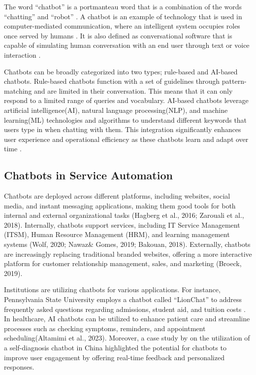The word “chatbot” is a portmanteau word that is a combination of the words “chatting” and “robot” \cite{rese2020}. A chatbot is an example of technology that is used in computer-mediated communication, where an intelligent system occupies roles once served by humans \cite{beattie2020}. It is also defined as conversational software that is capable of simulating human conversation with an end user through text or voice interaction \cite{Naruzzaman}.

Chatbots can be broadly categorized into two types; rule-based and AI-based chatbots. Rule-based chatbots function with a set of guidelines through pattern-matching and are limited in their conversation. This means that it can only respond to a limited range of queries and vocabulary. AI-based chatbots leverage artificial intelligence(AI), natural language processing(NLP), and machine learning(ML) technologies and algorithms to understand different keywords that users type in when chatting with them. This integration significantly enhances user experience and operational efficiency as these chatbots learn and adapt over time \cite{Kar2016}.

\subsection{Chatbots in Service Automation}
Chatbots are deployed across different platforms, including websites, social media, and instant messaging applications, making them good tools for both internal and external organizational tasks (Hagberg et al., 2016; Zarouali et al., 2018). Internally, chatbots support services, including IT Service Management (ITSM), Human Resource Management (HRM), and learning management systems (Wolf, 2020; Nawaz\& Gomes, 2019; Bakouan, 2018). Externally, chatbots are increasingly replacing traditional branded websites, offering a more interactive platform for customer relationship management, sales, and marketing (Broeck, 2019).

Institutions are utilizing chatbots for various applications. For instance, Pennsylvania State University employs a chatbot called “LionChat” to address frequently asked questions regarding admissions, student aid, and tuition costs \cite{Pennstate}. In healthcare, AI chatbots can be utilized to enhance patient care and streamline processes such as checking symptoms, reminders, and appointment scheduling(Altamimi et al., 2023). Moreover, a case study by \cite{fan2021} on the utilization of a self-diagnosis chatbot in China highlighted the potential for chatbots to improve user engagement by offering real-time feedback and personalized responses.


